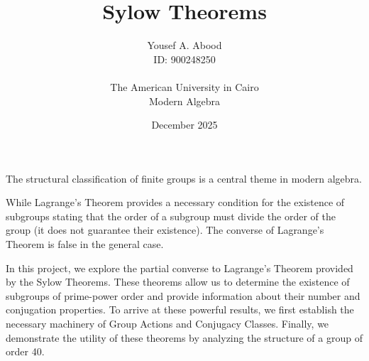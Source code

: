 \documentclass[a4paper,12pt]{article}
\title{\textbf{Sylow Theorems}}
\author{Yousef A. Abood \\ ID: 900248250 \\[0.5cm]\\The American University in Cairo\\Modern Algebra}
\date{December 2025}
\begin{document}
\maketitle

    The structural classification of finite groups is a central theme in modern algebra.

    While Lagrange's Theorem provides a necessary condition for the existence of subgroups stating that the order of a subgroup must divide the order of the group (it does not guarantee their existence).
The converse of Lagrange's Theorem is false in the general case.

In this project, we explore the partial converse to Lagrange's Theorem provided by the Sylow Theorems.
These theorems allow us to determine the existence of subgroups of prime-power order and provide information about their number and conjugation properties.
To arrive at these powerful results, we first establish the necessary machinery of Group Actions and Conjugacy Classes. Finally, we demonstrate the utility of these theorems by analyzing the structure of a group of order 40.
\end{document}
